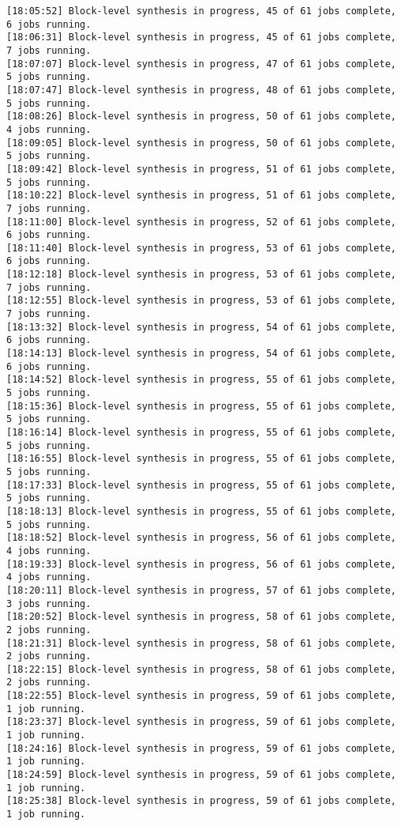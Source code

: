 \begin{lstlisting}[label=some-code-2,caption=Содержимое файла v++\_vinc.log]
[18:05:52] Block-level synthesis in progress, 45 of 61 jobs complete, 6 jobs running.
[18:06:31] Block-level synthesis in progress, 45 of 61 jobs complete, 7 jobs running.
[18:07:07] Block-level synthesis in progress, 47 of 61 jobs complete, 5 jobs running.
[18:07:47] Block-level synthesis in progress, 48 of 61 jobs complete, 5 jobs running.
[18:08:26] Block-level synthesis in progress, 50 of 61 jobs complete, 4 jobs running.
[18:09:05] Block-level synthesis in progress, 50 of 61 jobs complete, 5 jobs running.
[18:09:42] Block-level synthesis in progress, 51 of 61 jobs complete, 5 jobs running.
[18:10:22] Block-level synthesis in progress, 51 of 61 jobs complete, 7 jobs running.
[18:11:00] Block-level synthesis in progress, 52 of 61 jobs complete, 6 jobs running.
[18:11:40] Block-level synthesis in progress, 53 of 61 jobs complete, 6 jobs running.
[18:12:18] Block-level synthesis in progress, 53 of 61 jobs complete, 7 jobs running.
[18:12:55] Block-level synthesis in progress, 53 of 61 jobs complete, 7 jobs running.
[18:13:32] Block-level synthesis in progress, 54 of 61 jobs complete, 6 jobs running.
[18:14:13] Block-level synthesis in progress, 54 of 61 jobs complete, 6 jobs running.
[18:14:52] Block-level synthesis in progress, 55 of 61 jobs complete, 5 jobs running.
[18:15:36] Block-level synthesis in progress, 55 of 61 jobs complete, 5 jobs running.
[18:16:14] Block-level synthesis in progress, 55 of 61 jobs complete, 5 jobs running.
[18:16:55] Block-level synthesis in progress, 55 of 61 jobs complete, 5 jobs running.
[18:17:33] Block-level synthesis in progress, 55 of 61 jobs complete, 5 jobs running.
[18:18:13] Block-level synthesis in progress, 55 of 61 jobs complete, 5 jobs running.
[18:18:52] Block-level synthesis in progress, 56 of 61 jobs complete, 4 jobs running.
[18:19:33] Block-level synthesis in progress, 56 of 61 jobs complete, 4 jobs running.
[18:20:11] Block-level synthesis in progress, 57 of 61 jobs complete, 3 jobs running.
[18:20:52] Block-level synthesis in progress, 58 of 61 jobs complete, 2 jobs running.
[18:21:31] Block-level synthesis in progress, 58 of 61 jobs complete, 2 jobs running.
[18:22:15] Block-level synthesis in progress, 58 of 61 jobs complete, 2 jobs running.
[18:22:55] Block-level synthesis in progress, 59 of 61 jobs complete, 1 job running.
[18:23:37] Block-level synthesis in progress, 59 of 61 jobs complete, 1 job running.
[18:24:16] Block-level synthesis in progress, 59 of 61 jobs complete, 1 job running.
[18:24:59] Block-level synthesis in progress, 59 of 61 jobs complete, 1 job running.
[18:25:38] Block-level synthesis in progress, 59 of 61 jobs complete, 1 job running.

\end{lstlisting}
